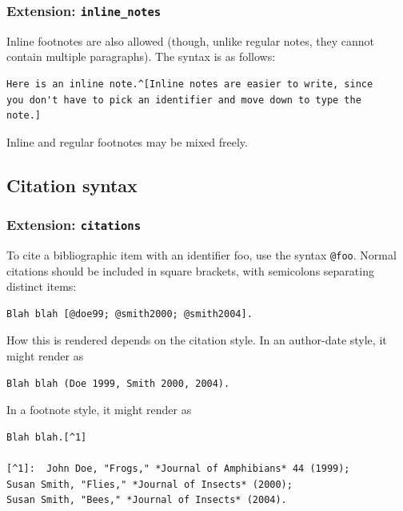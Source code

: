 \documentclass[
]{article}
\begin{document}
\hypertarget{extension-inline_notes}{%
\subsubsection{\texorpdfstring{Extension:
\texttt{inline\_notes}}{Extension: inline\_notes}}\label{extension-inline_notes}}

Inline footnotes are also allowed (though, unlike regular notes, they
cannot contain multiple paragraphs). The syntax is as follows:

\begin{verbatim}
Here is an inline note.^[Inline notes are easier to write, since
you don't have to pick an identifier and move down to type the
note.]
\end{verbatim}

Inline and regular footnotes may be mixed freely.

\hypertarget{citation-syntax}{%
\subsection{Citation syntax}\label{citation-syntax}}

\hypertarget{extension-citations}{%
\subsubsection{\texorpdfstring{Extension:
\texttt{citations}}{Extension: citations}}\label{extension-citations}}

To cite a bibliographic item with an identifier foo, use the syntax
\texttt{@foo}. Normal citations should be included in square brackets,
with semicolons separating distinct items:

\begin{verbatim}
Blah blah [@doe99; @smith2000; @smith2004].
\end{verbatim}

How this is rendered depends on the citation style. In an author-date
style, it might render as

\begin{verbatim}
Blah blah (Doe 1999, Smith 2000, 2004).
\end{verbatim}

In a footnote style, it might render as

\begin{verbatim}
Blah blah.[^1]

[^1]:  John Doe, "Frogs," *Journal of Amphibians* 44 (1999);
Susan Smith, "Flies," *Journal of Insects* (2000);
Susan Smith, "Bees," *Journal of Insects* (2004).
\end{verbatim}
\end{document}
